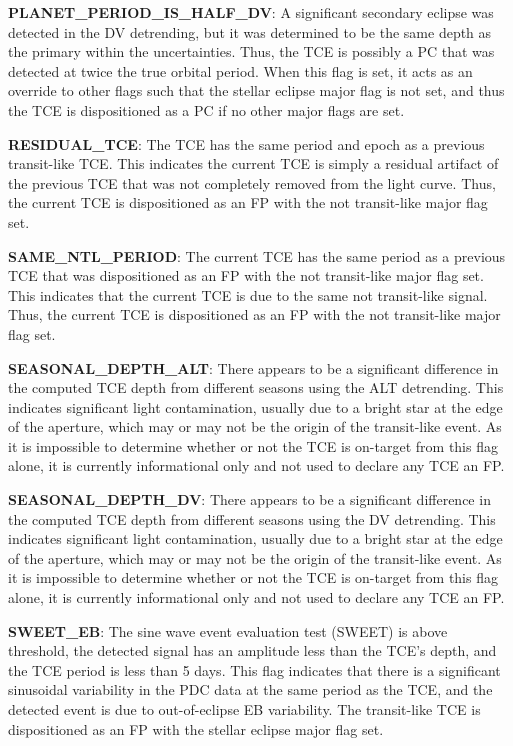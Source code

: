 \textbf{PLANET\_PERIOD\_IS\_HALF\_DV}: A significant secondary eclipse was detected in the DV detrending, but it was determined to be the same depth as the primary within the uncertainties. Thus, the TCE is possibly a PC that was detected at twice the true orbital period. When this flag is set, it acts as an override to other flags such that the stellar eclipse major flag is not set, and thus the TCE is dispositioned as a PC if no other major flags are set.

\textbf{RESIDUAL\_TCE}: The TCE has the same period and epoch as a previous transit-like TCE. This indicates the current TCE is simply a residual artifact of the previous TCE that was not completely removed from the light curve. Thus, the current TCE is dispositioned as an FP with the not transit-like major flag set.

\textbf{SAME\_NTL\_PERIOD}: The current TCE has the same period as a previous TCE that was dispositioned as an FP with the not transit-like major flag set. This indicates that the current TCE is due to the same not transit-like signal. Thus, the current TCE is dispositioned as an FP with the not transit-like major flag set.

\textbf{SEASONAL\_DEPTH\_ALT}: There appears to be a significant difference in the computed TCE depth from different seasons using the ALT detrending. This indicates significant light contamination, usually due to a bright star at the edge of the aperture, which may or may not be the origin of the transit-like event. As it is impossible to determine whether or not the TCE is on-target from this flag alone, it is currently informational only and not used to declare any TCE an FP.

\textbf{SEASONAL\_DEPTH\_DV}: There appears to be a significant difference in the computed TCE depth from different seasons using the DV detrending. This indicates significant light contamination, usually due to a bright star at the edge of the aperture, which may or may not be the origin of the transit-like event. As it is impossible to determine whether or not the TCE is on-target from this flag alone, it is currently informational only and not used to declare any TCE an FP.

\textbf{SWEET\_EB}: The sine wave event evaluation test (SWEET) is above threshold, the detected signal has an amplitude less than the TCE's depth, and the TCE period is less than 5 days. This flag indicates that there is a significant sinusoidal variability in the PDC data at the same period as the TCE, and the detected event is due to out-of-eclipse EB variability. The transit-like TCE is dispositioned as an FP with the stellar eclipse major flag set.

